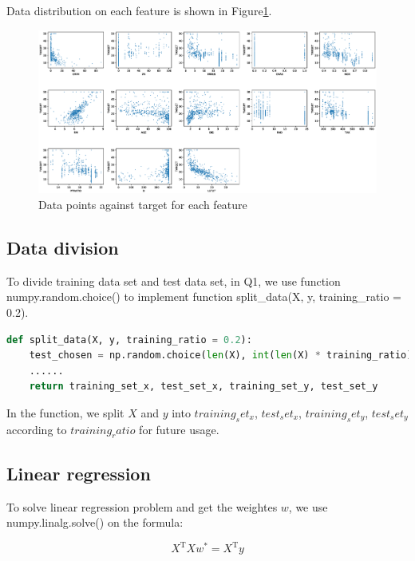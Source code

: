 \documentclass[a4paper]{article}
\begin{document}
Data distribution on each feature is shown in Figure\ref{fig: Data distribution}.

\begin{figure}[htbp]
\centering
\includegraphics[width = 15cm]{DataDistribution}
\caption{Data points against target for each feature}
\label{fig: Data distribution}
\end{figure}

\subsection{Data division}

To divide training data set and test data set, in Q1, we use function numpy.random.choice() to implement function split\_data(X, y, training\_ratio = 0.2).

\begin{lstlisting}[language = Python]
def split_data(X, y, training_ratio = 0.2):
    test_chosen = np.random.choice(len(X), int(len(X) * training_ratio))
    ......
    return training_set_x, test_set_x, training_set_y, test_set_y
\end{lstlisting}

In the function, we split $X$ and $y$ into $training_set_x$, $test_set_x$, $training_set_y$, $test_set_y$ according to $training_ratio$ for future usage.

\subsection{Linear regression}

To solve linear regression problem and get the weightes $w$, we use numpy.linalg.solve() on the formula:

\begin{equation}
X^\mathrm{T}Xw^*=X^\mathrm{T}y
\end{equation}
\end{document}
